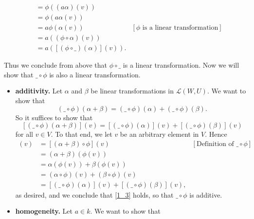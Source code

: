 \documentclass[9pt]{article}
\begin{document}
\begin{enumerate}
\begin{itemize}
\begin{align*}
                     &= \phi((a\alpha)(v)) \\
                     &= \phi(a\alpha(v)) \\
                     &= a\phi(\alpha(v)) 
                        &[\phi\text{ is a linear transformation}] \\
                     &= a((\phi\circ\alpha)(v)) \\
                     &= a([(\phi\circ\_)(\alpha)](v)).
               \end{align*}
      \end{itemize}
      Thus we conclude from above that $\phi\circ\_$ is a linear transformation.
      Now we will show that $\_\circ\phi$ is also a linear transformation.
      
      \begin{itemize}
         \item \textbf{additivity.} Let $\alpha$ and $\beta$ be linear
               transformations in $\mathcal{L}(W, U)$. We want to show that
               \begin{equation} \label{1_3}
                  (\_\circ\phi)(\alpha+\beta) = (\_\circ\phi)(\alpha) +
                  (\_\circ\phi)(\beta).
               \end{equation}
               So it suffices to show that
               $$[(\_\circ\phi)(\alpha+\beta)](v) = [(\_\circ\phi)(\alpha)](v) +
                 [(\_\circ\phi)(\beta)](v)$$
               for all $v \in V$. To that end, we let $v$ be an arbitrary
               element in $V$. Hence
               \begin{align*}
                  [(\_\circ\phi)(\alpha+\beta)](v) &=
                     [(\alpha+\beta)\circ\phi](v)
                        &[\text{Definition of }\_\circ\phi ] \\
                     &= (\alpha + \beta)(\phi(v)) \\
                     &= \alpha(\phi(v)) + \beta(\phi(v)) \\
                     &= (\alpha\circ\phi)(v) + (\beta\circ\phi)(v) \\
                     &= [(\_\circ\phi)(\alpha)](v) + [(\_\circ\phi)(\beta)](v),
               \end{align*}
               as desired, and we conclude that \eqref{1_3} holds, so that
               $\_\circ\phi$ is additive.
         \item \textbf{homogeneity.} Let $a \in k$. We want to show that
               \begin{equation} \label{1_4}

\end{equation}
\end{itemize}
\end{enumerate}
\end{document}
